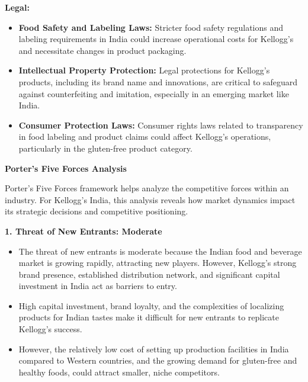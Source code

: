 \documentclass[10pt,a4paper]{book}
\begin{document}
\vspace{0.5cm}

\textbf{Legal:}
\begin{itemize}
    \item \textbf{Food Safety and Labeling Laws:} Stricter food safety regulations and labeling requirements in India could increase operational costs for Kellogg’s and necessitate changes in product packaging.
    \item \textbf{Intellectual Property Protection:} Legal protections for Kellogg’s products, including its brand name and innovations, are critical to safeguard against counterfeiting and imitation, especially in an emerging market like India.
    \item \textbf{Consumer Protection Laws:} Consumer rights laws related to transparency in food labeling and product claims could affect Kellogg’s operations, particularly in the gluten-free product category.
\end{itemize}

\vspace{0.5cm}

\begin{center} 
\textbf{Porter's Five Forces Analysis}
\end{center}

Porter's Five Forces framework helps analyze the competitive forces within an industry. For Kellogg’s India, this analysis reveals how market dynamics impact its strategic decisions and competitive positioning.

\vspace{0.5cm}

\textbf{1. Threat of New Entrants: Moderate}
\begin{itemize}
    \item The threat of new entrants is moderate because the Indian food and beverage market is growing rapidly, attracting new players. However, Kellogg's strong brand presence, established distribution network, and significant capital investment in India act as barriers to entry.
    \item High capital investment, brand loyalty, and the complexities of localizing products for Indian tastes make it difficult for new entrants to replicate Kellogg's success.
    \item However, the relatively low cost of setting up production facilities in India compared to Western countries, and the growing demand for gluten-free and healthy foods, could attract smaller, niche competitors.
\end{itemize}
\end{document}
